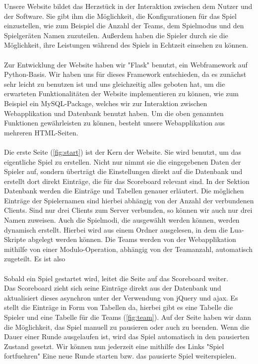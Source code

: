 Unsere Website bildet das Herzstück in der Interaktion zwischen dem Nutzer und der Software. Sie gibt ihm die Möglichkeit, die Konfigurationen für das Spiel einzustellen, wie zum Beispiel die Anzahl der Teams, dem Spielmodus und den Spielgeräten Namen zuzuteilen. Außerdem haben die Spieler durch sie die Möglichkeit, ihre Leistungen während des Spiels in Echtzeit einsehen zu können.\\\\
Zur Entwicklung der Website haben wir "Flask" benutzt, ein Webframework auf Python-Basis. Wir haben uns für dieses Framework entschieden, da es zunächst sehr leicht zu benutzen ist und uns gleichzeitig alles geboten hat, um die erwarteten Funktionalitäten der Website implementieren zu können, wie zum Beispiel ein MySQL-Package, welches wir zur Interaktion zwischen Webapplikation und Datenbank benutzt haben.
Um die oben genannten Funktionen gewährleisten zu können, besteht unsere Webapplikation aus mehreren HTML-Seiten.\\\\
Die erste Seite (\cref{fig:start}) ist der Kern der Website. Sie wird benutzt, um das eigentliche Spiel zu erstellen. Nicht nur nimmt sie die eingegebenen Daten der Spieler auf, sondern überträgt die Einstellungen direkt auf die Datenbank und erstellt dort direkt Einträge, die für das Scoreboard relevant sind. In der Sektion Datenbank werden die Einträge und Tabellen genauer erläutert. Die möglichen Einträge der Spielernamen sind hierbei abhängig von der Anzahl der verbundenen Clients. Sind nur drei Clients zum Server verbunden, so können wir auch nur drei Namen zuweisen.
Auch die Spielmodi, die ausgewählt werden können, werden dynamisch erstellt. Hierbei wird aus einem Ordner ausgelesen, in dem die Lua-Skripte abgelegt werden können. Die Teams werden von der Webapplikation mithilfe von einer Modulo-Operation, abhängig von der Teamanzahl, automatisch zugeteilt. Es ist also \\\\
Sobald ein Spiel gestartet wird, leitet die Seite auf das Scoreboard weiter.\\ Das Scoreboard zieht sich seine Einträge direkt aus der Datenbank und aktualisiert dieses asynchron unter der Verwendung von jQuery und ajax. Es stellt die Einträge in Form von Tabellen da, hierbei gibt es eine Tabelle die Spieler und eine Tabelle für die Teams (\cref{fig:team}). Auf der Seite haben wir dann die Möglichkeit, das Spiel manuell zu pausieren oder auch zu beenden. Wenn die Dauer einer Runde ausgelaufen ist, wird das Spiel automatisch in den pausierten Zustand gesetzt. Wir können nun jederzeit eine mithilfe des Links "Spiel fortfuehren" Eine neue Runde starten bzw. das pausierte Spiel weiterspielen.\\
